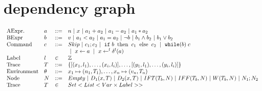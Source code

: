 \documentclass[a4paper,11pt]{article}
\newcommand{\aexpr}{a}
\newcommand{\bexpr}{b}
\newcommand{\cmd}{c}
\newcommand{\node}{N}
\newcommand{\assign}[2]{ \mathrel{ #1  \leftarrow #2 } }
\newcommand{\fassign}[3]{ \mathrel{ #1  \leftarrow^{#3}  \delta^{#3}(
    #2 ) } }
\newcommand{\impif}[3]{\mathrel{\eif \eapp #1\eapp \ethen \eapp #2 \eapp
    \eelse \eapp #3 }}
\newcommand{\impwhile}[2]{\mathrel{ \kw{while} (#1) \eapp #2 } }
\newcommand{\labl}{l}
\theoremstyle{definition}
\begin{document}
\section{dependency graph}



\[\begin{array}{llll}
\mbox{AExpr.} & \aexpr & ::= & n~|~ x ~|~ \aexpr_1 + \aexpr_2  ~|~  \aexpr_1 -
                            \aexpr_2 ~|~ \aexpr_1 * \aexpr_2 \\
%
\mbox{BExpr} & \bexpr & ::= & v ~|~  \aexpr_1 < \aexpr_2 ~|~ \aexpr_1
                              = \aexpr_2 ~|~ \neg \bexpr ~|~ \bexpr_1
                              \land \bexpr_2 ~|~ \bexpr_1 \lor \bexpr_2
\\
  \mbox{Command} & \cmd& ::= & Skip ~|~ \cmd_1 ; \cmd_2 ~|~ \impif{\bexpr}{\cmd_1}{\cmd_2}
                               ~|~             \impwhile{\bexpr}{\cmd}  \\
              &&& ~|~\assign{x}{\aexpr} ~|~ \fassign{x}{\aexpr}{l}  
    \\
    \mbox{Label}  & \labl & \in &  \mathbb{Z} \\
    \mbox{Trace} & T & ::= &   \{  [(x_1,\labl_1),\dots, (x_i,
                             \labl_i)],  \dots,  [(y_1,\labl_1),\dots, (y_i,
                             \labl_i)]  \}    \\
\mbox{Environment} & \env & ::= & x_1 \mapsto (n_1, T_1),
                                  \ldots, x_n \mapsto
                                  (\valr_n,T_n) \\
    \mbox{Node}  & \node & ::=&  Empty ~|~D_1(x, T) ~|~ D_2(x,T) ~|~ IFT(T_b, \node) ~|~
                                IFF(T_b, \node) ~|~ W (T_b, \node)
                                ~|~ \node_1 ; \node_2\\
                                  \mbox{Trace} & T & \in  & Set <
                                                            List<Var
                                                            \times Label> >
\end{array}\]






\end{document}
